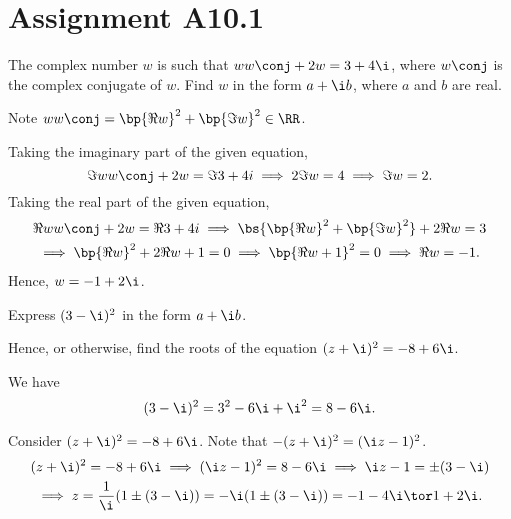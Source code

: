 \section{Assignment A10.1}

\begin{problem}
    The complex number $w$ is such that $w w\conj + 2w = 3 + 4\i$, where $w\conj$ is the complex conjugate of $w$. Find $w$ in the form $a + \i b$, where $a$ and $b$ are real.
\end{problem}
\begin{solution}
    Note $w w\conj = \bp{\Re w}^2 + \bp{\Im w}^2 \in \RR$.

    Taking the imaginary part of the given equation, \[\Im{ww\conj + 2w} = \Im{3 + 4i} \implies 2 \Im w = 4 \implies \Im w = 2.\] Taking the real part of the given equation,
    \begin{gather*}
        \Re{ww\conj + 2w} = \Re{3 + 4i} \implies \bs{\bp{\Re w}^2 + \bp{\Im w}^2} + 2\Re w = 3\\
        \implies \bp{\Re w}^2 + 2\Re {w} + 1 = 0 \implies \bp{\Re w + 1}^2 = 0 \implies \Re{w} = -1.
    \end{gather*}
    Hence, $w = -1 + 2\i$.
\end{solution}

\begin{problem}
    Express $(3 - \i)^2$ in the form $a + \i b$.

    Hence, or otherwise, find the roots of the equation $(z+\i)^2 = -8+6\i$.
\end{problem}
\begin{solution}
    We have \[(3 - \i)^2 = 3^2 - 6 \i + \i^2 = 8 - 6\i.\]

    Consider $(z+\i)^2 = -8+6\i$. Note that $-(z+\i)^2 = (\i z - 1)^2$.
    \begin{gather*}
        (z+\i)^2 = -8 + 6\i \implies (\i z - 1)^2 = 8 - 6\i \implies \i z - 1 = \pm (3 - \i)\\
        \implies z = \frac1\i (1 \pm (3 - \i)) = -\i(1 \pm (3 - \i)) = -1-4\i \tor 1 + 2\i.
    \end{gather*}
\end{solution}

